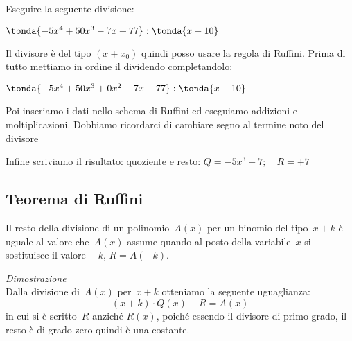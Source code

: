 %
 \begin{esempio}
Eseguire la seguente divisione:

\(\tonda{-5x^4 +50x^3 -7x +77  } : \tonda{x -10}\)

Il divisore è del tipo \((x + x_0)\) quindi posso usare la regola di Ruffini.
Prima di tutto mettiamo in ordine il dividendo completandolo:

\(\tonda{-5x^4 +50x^3 +0x^2 -7x +77  } : \tonda{x -10}\)

Poi inseriamo i dati nello schema di Ruffini ed eseguiamo addizioni e 
moltiplicazioni. Dobbiamo ricordarci di cambiare segno al termine noto del 
divisore

\begin{inaccessibleblock}
\begin{center}
% 
\ruffinie
\end{center}
\end{inaccessibleblock}

Infine scriviamo il risultato: quoziente e resto:
\(Q = -5 x^3 -7 ; \quad R = +7\)
\end{esempio}

\subsection{Teorema di Ruffini}
\label{subsec:divpol_teorema_ruffini}

\begin{teorema}
 Il resto della divisione di un polinomio~\(A(x)\) per un
binomio del tipo~\(x+k\) è uguale al valore che~\(A(x)\) assume quando
al posto della variabile~\(x\) si sostituisce il valore~\(-k\), \(R=A(-k)\).
\end{teorema}

\emph{Dimostrazione}\\
Dalla divisione di~\(A(x)\) per~\(x+k\) otteniamo la seguente
uguaglianza:
\[(x+k)\cdot Q(x)+R=A(x)\]
in cui si è scritto~\(R\) anziché \(R(x)\), poiché essendo il divisore di 
primo grado, il resto è di grado zero quindi è una costante.


